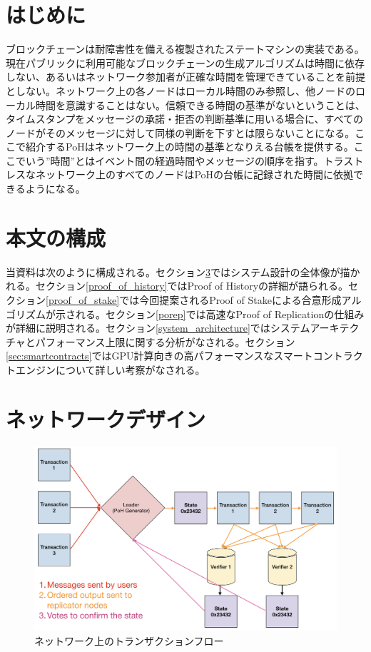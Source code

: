 \documentclass[12pt]{ltjsarticle}
\begin{document}
\section{はじめに}\normalsize
ブロックチェーンは耐障害性を備える複製されたステートマシンの実装である。現在パブリックに利用可能なブロックチェーンの生成アルゴリズムは時間に依存しない、あるいはネットワーク参加者が正確な時間を管理できていることを前提としない\cite{tendermint,hashgraph}。ネットワーク上の各ノードはローカル時間のみ参照し、他ノードのローカル時間を意識することはない。信頼できる時間の基準がないということは、タイムスタンプをメッセージの承諾・拒否の判断基準に用いる場合に、すべてのノードがそのメッセージに対して同様の判断を下すとは限らないことになる。ここで紹介するPoHはネットワーク上の時間の基準となりえる台帳を提供する。ここでいう”時間”とはイベント間の経過時間やメッセージの順序を指す。トラストレスなネットワーク上のすべてのノードはPoHの台帳に記録された時間に依拠できるようになる。

\section{本文の構成}
当資料は次のように構成される。セクション\ref{design}ではシステム設計の全体像が描かれる。セクション\ref{proof_of_history}ではProof of Historyの詳細が語られる。セクション\ref{proof_of_stake}では今回提案されるProof of Stakeによる合意形成アルゴリズムが示される。セクション\ref{porep}では高速なProof of Replicationの仕組みが詳細に説明される。セクション\ref{system_architecture}ではシステムアーキテクチャとパフォーマンス上限に関する分析がなされる。セクション\ref{sec:smartcontracts}ではGPU計算向きの高パフォーマンスなスマートコントラクトエンジンについて詳しい考察がなされる。

\section{ネットワークデザイン}\label{design}

\begin{figure}[h]
  \begin{center}
    \centering
    \includegraphics[width=\textwidth]{../../figures/network_design_001.png}
    \caption[Fig 1]{ネットワーク上のトランザクションフロー\label{fig:design}}
  \end{center}
  \end{figure}
\end{document}
